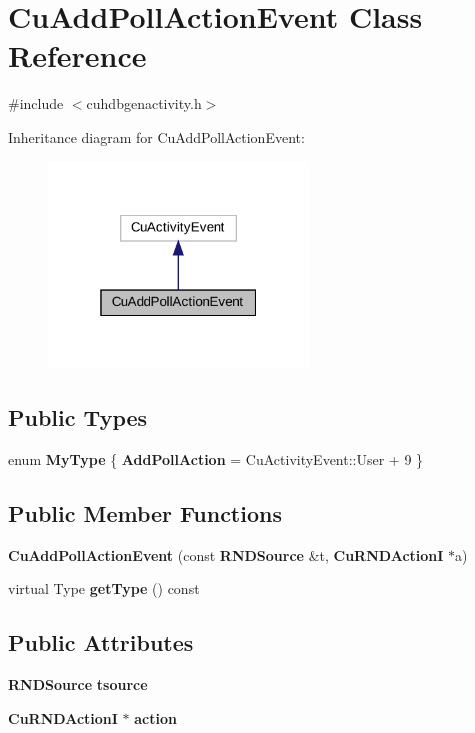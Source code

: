 \section{Cu\+Add\+Poll\+Action\+Event Class Reference}
\label{classCuAddPollActionEvent}


{\ttfamily \#include $<$cuhdbgenactivity.\+h$>$}



Inheritance diagram for Cu\+Add\+Poll\+Action\+Event\+:
\nopagebreak
\begin{figure}[H]
\begin{center}
\leavevmode
\includegraphics[width=196pt]{classCuAddPollActionEvent__inherit__graph}
\end{center}
\end{figure}
\subsection*{Public Types}
\begin{DoxyCompactItemize}
\item 
enum \textbf{ My\+Type} \{ \textbf{ Add\+Poll\+Action} = Cu\+Activity\+Event\+::User + 9
 \}
\end{DoxyCompactItemize}
\subsection*{Public Member Functions}
\begin{DoxyCompactItemize}
\item 
\textbf{ Cu\+Add\+Poll\+Action\+Event} (const \textbf{ R\+N\+D\+Source} \&t, \textbf{ Cu\+R\+N\+D\+ActionI} $\ast$a)
\item 
virtual Type \textbf{ get\+Type} () const
\end{DoxyCompactItemize}
\subsection*{Public Attributes}
\begin{DoxyCompactItemize}
\item 
\textbf{ R\+N\+D\+Source} \textbf{ tsource}
\item 
\textbf{ Cu\+R\+N\+D\+ActionI} $\ast$ \textbf{ action}
\end{DoxyCompactItemize}


